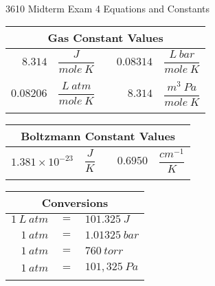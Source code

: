 \documentclass[12pt, letterpaper]{memoir}
\begin{document}
\newpage
\pagestyle{empty}

~
\vspace{-3em}
\begin{center}
	{\LARGE 3610 Midterm Exam 4 Equations and Constants}	
\end{center}

\vspace{-1em}\noindent
\begin{minipage}{0.57\linewidth}
	\begin{mdframed}
		\begin{tabular}{rlcrl}
			\multicolumn{5}{c}{Gas Constant Values}\\ \midrule
			$8.314$ & $\dfrac{J}{mole~K}$ && $0.08314$ & $\dfrac{L~bar}{mole~K}$\\ \\
			$0.08206$ & $\dfrac{L~atm}{mole~K}$ && $8.314$ & $\dfrac{m^3~Pa}{mole~K}$\\ \\
		\end{tabular}
		\begin{tabular}{rlcrl}
			\multicolumn{5}{c}{Boltzmann Constant Values}\\ \midrule
			$1.381 \times 10^{-23}$ & $\dfrac{J}{K}$ && $0.6950$ & $\dfrac{cm^{-1}}{K}$\\ \\
		\end{tabular}
	\end{mdframed}
\end{minipage}
\hspace{20pt}
\begin{minipage}{0.4\linewidth}
	\begin{mdframed}
		\begin{tabular}{rcl}
			\multicolumn{3}{c}{Conversions}\\ \midrule
			$1~L~atm $ & $=$ & $101.325~J$\\ \\
			$1~atm $ & $=$ & $1.01325~bar$\\ \\
			$1~atm $ & $=$ & $760~torr$\\ \\
			$1~atm $ & $=$ & $101,325~Pa$ \\ \\
		\end{tabular}
	\end{mdframed}	
\end{minipage}
\end{document}
